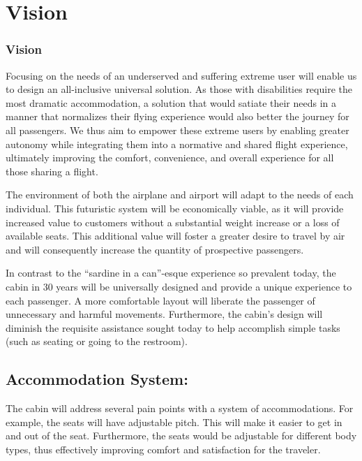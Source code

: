 \chapter{Vision}
\label{sec-vision} %

\subsection*{Vision}
Focusing on the needs of an underserved and suffering extreme user will enable us to design an all-inclusive universal solution. As those with disabilities require the most dramatic accommodation, a solution that would satiate their needs in a manner that normalizes their flying experience would also better the journey for all passengers. We thus aim to empower these extreme users by enabling greater autonomy while integrating them into a normative and shared flight experience, ultimately improving the comfort, convenience, and overall experience for all those sharing a flight.

The environment of both the airplane and airport will adapt to the needs of each individual. This futuristic system will be economically viable, as it will provide increased value to customers without a substantial weight increase or a loss of available seats. This additional value will foster a greater desire to travel by air and will consequently increase the quantity of prospective passengers.

In contrast to the “sardine in a can”-esque experience so prevalent today, the cabin in 30 years will be universally designed and provide a unique experience to each passenger. A more comfortable layout will liberate the passenger of unnecessary and harmful movements. Furthermore, the cabin’s design will diminish the requisite assistance sought today to help accomplish simple tasks (such as seating or going to the restroom).

\section{Accommodation System:}
The cabin will address several pain points with a system of accommodations. For example, the seats will have adjustable pitch. This will make it easier to get in and out of the seat. Furthermore, the seats would be adjustable for different body types, thus effectively improving comfort and satisfaction for the traveler. 

